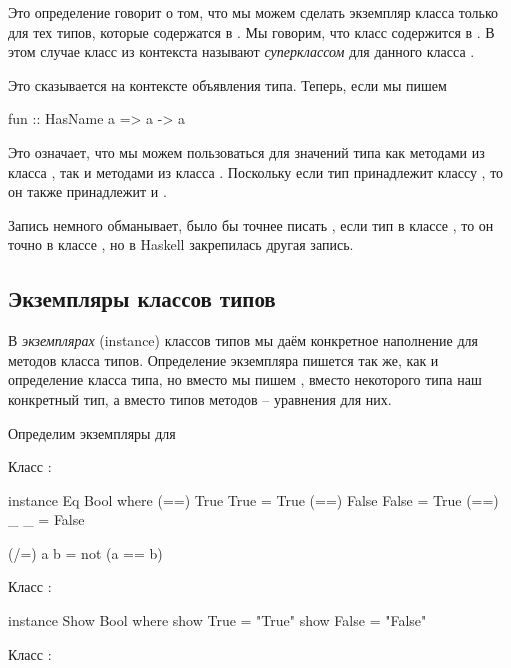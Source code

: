 Это определение говорит о том, что мы можем сделать 
экземпляр класса  
только для тех типов, которые содержатся в .
Мы говорим, что класс  содержится в .
В этом случае класс из контекста  
называют 
\emph{суперклассом} для данного класса .

Это сказывается на контексте объявления типа. Теперь, если мы пишем


\begin{code}
fun :: HasName a => a -> a
\end{code}


Это означает, что мы можем пользоваться для значений типа
 как методами из класса , так и методами 
из класса . Поскольку если тип принадлежит 
классу , то он также принадлежит и . 

Запись  немного обманывает, было бы точнее 
писать , если тип  в классе , то 
он точно в классе , но в Haskell  закрепилась другая запись.

\subsection{Экземпляры классов типов}

В 
\emph{экземплярах} (instance) классов типов мы даём конкретное
наполнение для методов класса типов. Определение экземпляра
пишется так же, как и определение класса типа, но вместо 
мы пишем  , вместо некоторого типа наш конкретный
тип, а вместо типов методов -- уравнения для них. 

Определим экземпляры для 

Класс :

\begin{code}
instance Eq Bool where
    (==) True  True  = True
    (==) False False = True
    (==) _     _     = False

    (/=) a b         = not (a == b)
\end{code}


Класс :

\begin{code}
instance Show Bool where
    show True  = "True"
    show False = "False"
\end{code}

Класс :

